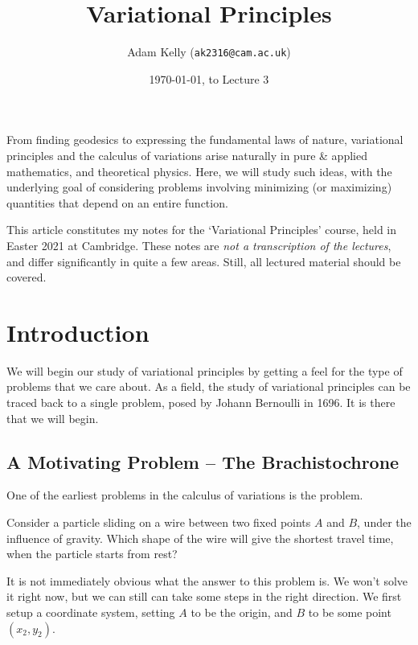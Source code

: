 \documentclass[a4paper]{scrartcl}
\title{Variational Principles}
\author{Adam Kelly (\texttt{ak2316@cam.ac.uk})}
\date{\today, to Lecture 3}
\begin{document}
\maketitle

From finding geodesics to expressing the fundamental laws of nature, variational principles and the calculus of variations arise naturally in pure \& applied mathematics, and theoretical physics.
Here, we will study such ideas, with the underlying goal of considering problems involving minimizing (or maximizing) quantities that depend on an entire function. 

This article constitutes my notes for the `Variational Principles' course, held in Easter 2021 at Cambridge. These notes are \emph{not a transcription of the lectures}, and differ significantly in quite a few areas. Still, all lectured material should be covered.


\tableofcontents

\section{Introduction}



We will begin our study of variational principles by getting a feel for the type of problems that we care about. 
As a field, the study of variational principles can be traced back to a single problem, posed by Johann Bernoulli in 1696. It is there that we will begin.

\subsection{A Motivating Problem -- The Brachistochrone}

One of the earliest problems in the calculus of variations is the  problem.

\begin{example}[Brachistochrone]
	Consider a particle sliding on a wire between two fixed points $A$ and $B$, under the influence of gravity. Which shape of the wire will give the shortest travel time, when the particle starts from rest?
\end{example}

It is not immediately obvious what the answer to this problem is. We won't solve it right now, but we can still can take some steps in the right direction. We first setup a coordinate system, setting $A$ to be the origin, and $B$ to be some point $(x_2, y_2)$.
\end{document}
